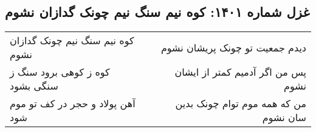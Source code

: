 \begin{center}
\section*{غزل شماره ۱۴۰۱: کوه نیم سنگ نیم چونک گدازان نشوم}
\label{sec:1401}
\begin{longtable}{l p{0.5cm} r}
کوه نیم سنگ نیم چونک گدازان نشوم
&&
دیدم جمعیت تو چونک پریشان نشوم
\\
کوه ز کوهی برود سنگ ز سنگی بشود
&&
پس من اگر آدمیم کمتر از ایشان نشوم
\\
آهن پولاد و حجر در کف تو موم شود
&&
من که همه موم توام چونک بدین سان نشوم
\\
\end{longtable}
\end{center}
